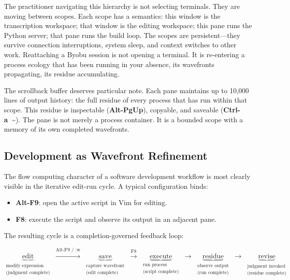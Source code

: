 \documentclass[12pt, a4paper]{article}
\begin{document}
The practitioner navigating this hierarchy is not selecting
terminals. They are moving between scopes. Each scope has a
semantics: this window is the transcription workspace; that
window is the editing workspace; this pane runs the Python
server; that pane runs the build loop. The scopes are
persistent---they survive connection interruptions, system
sleep, and context switches to other work. Reattaching a Byobu
session is not opening a terminal. It is re-entering a process
ecology that has been running in your absence, its wavefronts
propagating, its residue accumulating.

The scrollback buffer deserves particular note. Each pane
maintains up to 10,000 lines of output history: the full
residue of every process that has run within that scope.
This residue is inspectable (\textbf{Alt-PgUp}), copyable,
and saveable (\textbf{Ctrl-a~\textasciitilde}). The pane is
not merely a process container. It is a bounded scope with a
memory of its own completed wavefronts.

\subsection{Development as Wavefront Refinement}

The flow computing character of a software development workflow
is most clearly visible in the iterative edit-run cycle. A
typical configuration binds:

\begin{itemize}
\item \textbf{Alt-F9}: open the active script in Vim for
  editing.
\item \textbf{F8}: execute the script and observe its output
  in an adjacent pane.
\end{itemize}

The resulting cycle is a completion-governed feedback loop:

\[
\underbrace{\text{edit}}_{\substack{\text{modify expression}\\\text{(judgment complete)}}}
\;\xrightarrow{\text{Alt-F9 / :w}}\;
\underbrace{\text{save}}_{\substack{\text{capture wavefront}\\\text{(edit complete)}}}
\;\xrightarrow{\text{F8}}\;
\underbrace{\text{execute}}_{\substack{\text{run process}\\\text{(script complete)}}}
\;\xrightarrow{}\;
\underbrace{\text{residue}}_{\substack{\text{observe output}\\\text{(run complete)}}}
\;\xrightarrow{}\;
\underbrace{\text{revise}}_{\substack{\text{judgment invoked}\\\text{(residue complete)}}}
\]
\end{document}
